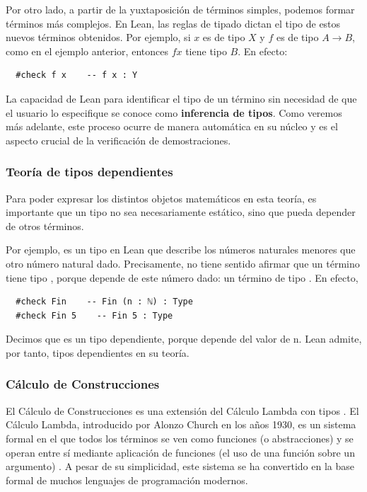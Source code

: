 Por otro lado, a partir de la yuxtaposición de términos simples, podemos formar términos más complejos. En Lean, las reglas de tipado dictan el tipo de estos nuevos términos obtenidos. Por ejemplo, si $x$ es de tipo $X$ y $f$ es de tipo $A \to B$, como en el ejemplo anterior, entonces $f x$ tiene tipo $B$. En efecto:

\begin{lstlisting}
  #check f x    -- f x : Y
\end{lstlisting}

La capacidad de Lean para identificar el tipo de un término sin necesidad de que el usuario lo especifique se conoce como \textbf{inferencia de tipos}. Como veremos más adelante, este proceso ocurre de manera automática en su núcleo y es el aspecto crucial de la verificación de demostraciones.

\subsubsection{Teoría de tipos dependientes}

Para poder expresar los distintos objetos matemáticos en esta teoría, es importante que un tipo no sea necesariamente estático, sino que pueda depender de otros términos.

Por ejemplo,  es un tipo en Lean que describe los números naturales menores que otro número natural dado. Precisamente, no tiene sentido afirmar que un término tiene tipo , porque  depende de este número dado: un término de tipo . En efecto,

\begin{lstlisting}
  #check Fin    -- Fin (n : ℕ) : Type
  #check Fin 5    -- Fin 5 : Type
\end{lstlisting}

Decimos que  es un tipo dependiente, porque depende del valor de n. Lean admite, por tanto, tipos dependientes en su teoría.

\subsubsection{Cálculo de Construcciones}

El Cálculo de Construcciones es una extensión del Cálculo Lambda con tipos \cite{coquand1986calculus}. El Cálculo Lambda, introducido por Alonzo Church en los años 1930, es un sistema formal en el que todos los términos se ven como funciones (o abstracciones) y se operan entre sí mediante aplicación de funciones (el uso de una función sobre un argumento) \cite{pierce2002types}. A pesar de su simplicidad, este sistema se ha convertido en la base formal de muchos lenguajes de programación modernos.

